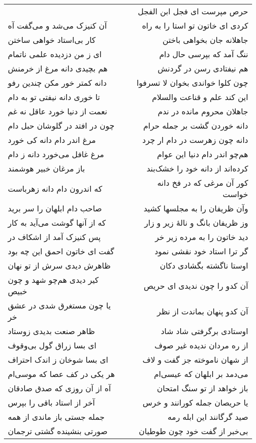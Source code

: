 \begin{center}
\begin{longtable}{l p{0.5cm} r}
&&
حرص مپرست ای فجل ابن الفجل
\\
آن کنیزک می‌شد و می‌گفت آه
&&
کردی ای خاتون تو استا را به راه
\\
کار بی‌استاد خواهی ساختن
&&
جاهلانه جان بخواهی باختن
\\
ای ز من دزدیده علمی ناتمام
&&
ننگ آمد که بپرسی حال دام
\\
هم بچیدی دانه مرغ از خرمنش
&&
هم نیفتادی رسن در گردنش
\\
دانه کمتر خور مکن چندین رفو
&&
چون کلوا خواندی بخوان لا تسرفوا
\\
تا خوری دانه نیفتی تو به دام
&&
این کند علم و قناعت والسلام
\\
نعمت از دنیا خورد عاقل نه غم
&&
جاهلان محروم مانده در ندم
\\
چون در افتد در گلوشان حبل دام
&&
دانه خوردن گشت بر جمله حرام
\\
مرغ اندر دام دانه کی خورد
&&
دانه چون زهرست در دام ار چرد
\\
مرغ غافل می‌خورد دانه ز دام
&&
هم‌چو اندر دام دنیا این عوام
\\
باز مرغان خبیر هوشمند
&&
کرده‌اند از دانه خود را خشک‌بند
\\
که اندرون دام دانه زهرباست
&&
کور آن مرغی که در فخ دانه خواست
\\
صاحب دام ابلهان را سر برید
&&
وآن ظریفان را به مجلسها کشید
\\
که از آنها گوشت می‌آید به کار
&&
وز ظریفان بانگ و نالهٔ زیر و زار
\\
پس کنیزک آمد از اشکاف در
&&
دید خاتون را به مرده زیر خر
\\
گفت ای خاتون احمق این چه بود
&&
گر ترا استاد خود نقشی نمود
\\
ظاهرش دیدی سرش از تو نهان
&&
اوستا ناگشته بگشادی دکان
\\
کیر دیدی هم‌چو شهد و چون خبیص
&&
آن کدو را چون ندیدی ای حریص
\\
یا چون مستغرق شدی در عشق خر
&&
آن کدو پنهان بماندت از نظر
\\
ظاهر صنعت بدیدی زوستاد
&&
اوستادی برگرفتی شاد شاد
\\
ای بسا زراق گول بی‌وقوف
&&
از ره مردان ندیده غیر صوف
\\
ای بسا شوخان ز اندک احتراف
&&
از شهان ناموخته جز گفت و لاف
\\
هر یکی در کف عصا که موسی‌ام
&&
می‌دمد بر ابلهان که عیسی‌ام
\\
آه از آن روزی که صدق صادقان
&&
باز خواهد از تو سنگ امتحان
\\
آخر از استاد باقی را بپرس
&&
یا حریصان جمله کورانند و خرس
\\
جمله جستی باز ماندی از همه
&&
صید گرگانند این ابله رمه
\\
صورتی بنشینده گشتی ترجمان
&&
بی‌خبر از گفت خود چون طوطیان
\\
\end{longtable}
\end{center}
